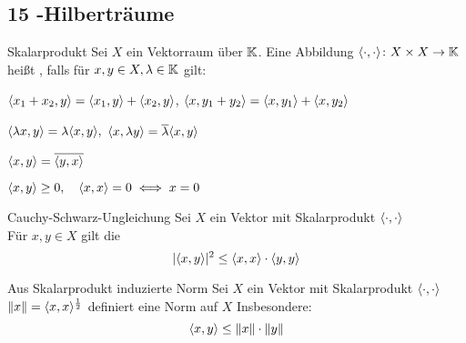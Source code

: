 \subsection*{15 -Hilberträume}


\begin{karte}{Skalarprodukt}
	Sei $X$ ein Vektorraum über $\mathbb{K}$. Eine Abbildung $\langle \cdot, \cdot \rangle \colon X \times X \rightarrow \mathbb{K}$ hei{\ss}t , falls für $x, y \in X, \lambda \in \mathbb{K}$ gilt:
	\begin{description}
	 	\label{def:15.1i}
	 	\item[$\hspace{0.5cm} (S1) \hspace{0.1cm} $] $\langle x_{1} + x_{2}, y \rangle = \langle x_{1}, y \rangle + \langle x_{2}, y \rangle$, $\langle x, y_{1} + y_{2} \rangle = \langle x, y_{1} \rangle + \langle x, y_{2} \rangle$
 		\label{def:15.1ii}
	 	\item[$\hspace{0.5cm} (S2) \hspace{0.1cm} $] $\langle \lambda x, y \rangle = \lambda \langle x, y \rangle,$ $\langle x, \lambda y \rangle = \overline{\lambda} \langle x, y \rangle$
 		\label{def:15.1iii}
	 	\item[$\hspace{0.5cm} (S3) \hspace{0.1cm} $] $\langle x, y \rangle = \overline{\langle y, x \rangle }$
 		\label{def:15.1iv}
	 	\item[$\hspace{0.5cm} (S4) \hspace{0.1cm} $] $\langle x, y \rangle \geq 0, \quad \langle x, x \rangle = 0 \iff x = 0$
	\end{description}
\end{karte}


\begin{karte}{Cauchy-Schwarz-Ungleichung}
	Sei $X$ ein Vektor mit Skalarprodukt $\langle \cdot, \cdot \rangle$ \\
	
	Für $x, y \in X$ gilt die 
			\[ | \langle x, y \rangle |^{2} \leq \langle x, x \rangle \cdot \langle y, y \rangle \]
\end{karte}

\begin{karte}{Aus Skalarprodukt induzierte Norm}
	Sei $X$ ein Vektor mit Skalarprodukt $\langle \cdot, \cdot \rangle$ \\
	
	$\| x \| = \langle x, x \rangle^{\frac{1}{2}}$ definiert eine Norm auf $X$
	Insbesondere: 
	\[ \langle x, y \rangle \leq \| x \| \cdot \| y \| \]
\end{karte}

